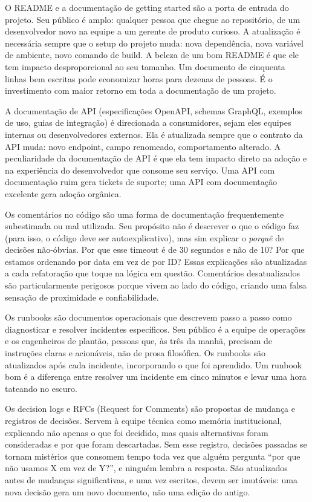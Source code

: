 O README e a documentação de getting started são a porta de entrada do
projeto. Seu público é amplo: qualquer pessoa que chegue ao
repositório, de um desenvolvedor novo na equipe a um gerente de produto
curioso. A atualização é necessária sempre que o setup do projeto muda:
nova dependência, nova variável de ambiente, novo comando de build. A
beleza de um bom README é que ele tem impacto desproporcional ao seu
tamanho. Um documento de cinquenta linhas bem escritas pode economizar
horas para dezenas de pessoas. É o investimento com maior retorno em
toda a documentação de um projeto.

A documentação de API (especificações OpenAPI, schemas GraphQL,
exemplos de uso, guias de integração) é direcionada a consumidores,
sejam eles equipes internas ou desenvolvedores externos. Ela é atualizada
sempre que o contrato da API muda: novo endpoint, campo renomeado,
comportamento alterado. A peculiaridade da documentação de API é que ela
tem impacto direto na adoção e na experiência do desenvolvedor que
consome seu serviço. Uma API com documentação ruim gera tickets de
suporte; uma API com documentação excelente gera adoção orgânica.

Os comentários no código são uma forma de documentação frequentemente
subestimada ou mal utilizada. Seu propósito não é descrever o que o
código faz (para isso, o código deve ser autoexplicativo), mas sim
explicar o \textit{porquê} de decisões não-óbvias. Por que esse timeout
é de 30 segundos e não de 10? Por que estamos ordenando por data em vez
de por ID? Essas explicações são atualizadas a cada refatoração que
toque na lógica em questão. Comentários desatualizados são
particularmente perigosos porque vivem ao lado do código, criando uma
falsa sensação de proximidade e confiabilidade.

Os runbooks são documentos operacionais que descrevem passo a passo como
diagnosticar e resolver incidentes específicos. Seu público é a equipe
de operações e os engenheiros de plantão, pessoas que, às três da
manhã, precisam de instruções claras e acionáveis, não de prosa
filosófica. Os runbooks são atualizados após cada incidente, incorporando
o que foi aprendido. Um runbook bom é a diferença entre resolver um
incidente em cinco minutos e levar uma hora tateando no escuro.

Os decision logs e RFCs (Request for Comments) são propostas de mudança
e registros de decisões. Servem à equipe técnica como memória
institucional, explicando não apenas o que foi decidido, mas quais
alternativas foram consideradas e por que foram descartadas. Sem esse
registro, decisões passadas se tornam mistérios que consomem tempo toda
vez que alguém pergunta ``por que não usamos X em vez de Y?'', e
ninguém lembra a resposta. São atualizados antes de mudanças
significativas, e uma vez escritos, devem ser imutáveis: uma nova
decisão gera um novo documento, não uma edição do antigo.

